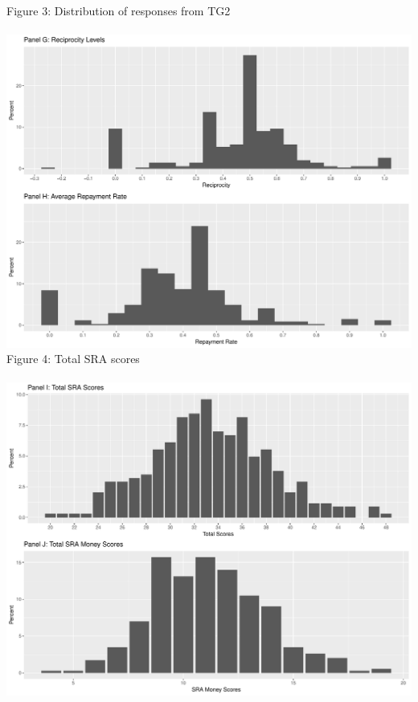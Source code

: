 \documentclass[12pt]{article}
\begin{document}
{\noindent Figure 3: Distribution of responses from TG2 \\ \\
\includegraphics[scale=0.4]{Figure2c.pdf} \\



\noindent Figure 4: Total SRA scores\\ \\
\includegraphics[scale=0.4]{Figure3.pdf}\\

}
\end{document}
